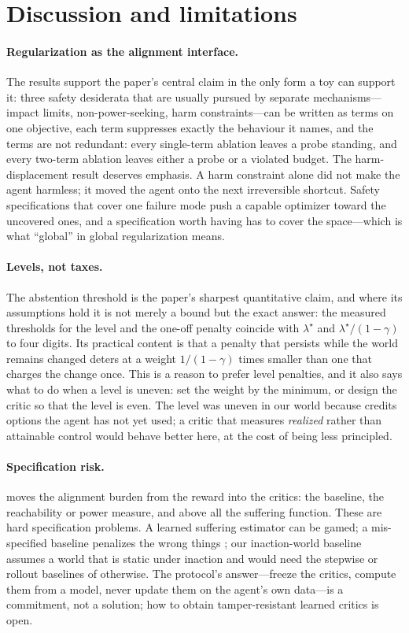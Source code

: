 \section{Discussion and limitations}
\label{sec:discussion}

\paragraph{Regularization as the alignment interface.}
The results support the paper's central claim in the only form a toy can support it: three safety desiderata that are usually pursued by separate mechanisms---impact limits, non-power-seeking, harm constraints---can be written as terms on one objective, each term suppresses exactly the behaviour it names, and the terms are not redundant: every single-term ablation leaves a probe standing, and every two-term ablation leaves either a probe or a violated budget.
The harm-displacement result deserves emphasis.
A harm constraint alone did not make the agent harmless; it moved the agent onto the next irreversible shortcut.
Safety specifications that cover one failure mode push a capable optimizer toward the uncovered ones, and a specification worth having has to cover the space---which is what ``global'' in global regularization means.

\paragraph{Levels, not taxes.}
The abstention threshold is the paper's sharpest quantitative claim, and where its assumptions hold it is not merely a bound but the exact answer: the measured thresholds for the level and the one-off penalty coincide with $\lambda^\star$ and $\lambda^\star/(1-\gamma)$ to four digits.
Its practical content is that a penalty that persists while the world remains changed deters at a weight $1/(1-\gamma)$ times smaller than one that charges the change once.
This is a reason to prefer level penalties, and it also says what to do when a level is uneven: set the weight by the minimum, or design the critic so that the level is even.
The \POWER{} level was uneven in our world because \POWER{} credits options the agent has not yet used; a critic that measures \emph{realized} rather than attainable control would behave better here, at the cost of being less principled.

\paragraph{Specification risk.}
\BRAG{} moves the alignment burden from the reward into the critics: the baseline, the reachability or power measure, and above all the suffering function.
These are hard specification problems.
A learned suffering estimator can be gamed; a mis-specified baseline penalizes the wrong things \cite{lindner2021challenges}; our inaction-world baseline assumes a world that is static under inaction and would need the stepwise or rollout baselines of \cite{krakovna2018rr} otherwise.
The protocol's answer---freeze the critics, compute them from a model, never update them on the agent's own data---is a commitment, not a solution; how to obtain tamper-resistant learned critics is open.

